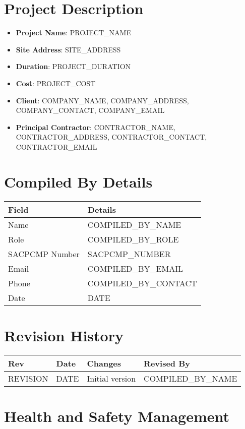 \documentclass[11pt]{article}
\newcommand{\issueDate}{{{DATE}}}
\newcommand{\projectName}{{{PROJECT_NAME}}}
\newcommand{\siteAddress}{{{SITE_ADDRESS}}}
\newcommand{\projectDuration}{{{PROJECT_DURATION}}}
\newcommand{\projectCost}{{{PROJECT_COST}}}
\newcommand{\clientName}{{{COMPANY_NAME}}}
\newcommand{\clientAddress}{{{COMPANY_ADDRESS}}}
\newcommand{\clientContact}{{{COMPANY_CONTACT}}, {{COMPANY_EMAIL}}}
\newcommand{\contractorName}{{{CONTRACTOR_NAME}}}
\newcommand{\contractorAddress}{{{CONTRACTOR_ADDRESS}}}
\newcommand{\contractorContact}{{{CONTRACTOR_CONTACT}}, {{CONTRACTOR_EMAIL}}}
\newcommand{\compilerName}{{{COMPILED_BY_NAME}}}
\newcommand{\compilerRole}{{{COMPILED_BY_ROLE}}}
\newcommand{\compilerSACPCMP}{{{SACPCMP_NUMBER}}}
\newcommand{\compilerEmail}{{{COMPILED_BY_EMAIL}}}
\newcommand{\compilerPhone}{{{COMPILED_BY_CONTACT}}}
\newcommand{\revision}{{{REVISION}}}
\begin{document}
\section{Project Description}
\begin{itemize}
    \item \textbf{Project Name}: \projectName
    \item \textbf{Site Address}: \siteAddress
    \item \textbf{Duration}: \projectDuration
    \item \textbf{Cost}: \projectCost
    \item \textbf{Client}: \clientName, \clientAddress, \clientContact
    \item \textbf{Principal Contractor}: \contractorName, \contractorAddress, \contractorContact
\end{itemize}

\section{Compiled By Details}
\begin{tabularx}{\textwidth}{lX}
  \toprule
  \textbf{Field} & \textbf{Details} \\
  \midrule
  Name & \compilerName \\
  Role & \compilerRole \\
  SACPCMP Number & \compilerSACPCMP \\
  Email & \compilerEmail \\
  Phone & \compilerPhone \\
  Date & \issueDate \\
  \bottomrule
\end{tabularx}

\section{Revision History}
\begin{tabularx}{\textwidth}{lXll}
  \toprule
  \textbf{Rev} & \textbf{Date} & \textbf{Changes} & \textbf{Revised By} \\
  \midrule
  \revision & \issueDate & Initial version & \compilerName \\
  \bottomrule
\end{tabularx}

\section{Health and Safety Management}
\end{document}

